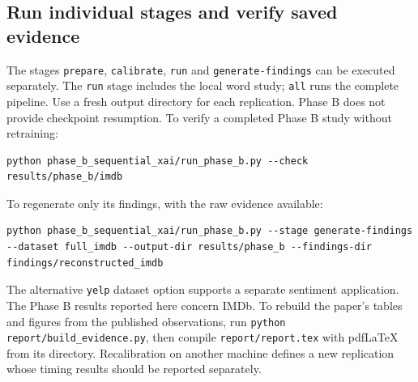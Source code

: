 \documentclass[12pt,a4paper]{article}
\begin{document}
\subsection{Run individual stages and verify saved evidence}
The stages \texttt{prepare}, \texttt{calibrate}, \texttt{run} and \texttt{generate-findings} can be executed separately. The \texttt{run} stage includes the local word study; \texttt{all} runs the complete pipeline. Use a fresh output directory for each replication. Phase B does not provide checkpoint resumption.
To verify a completed Phase B study without retraining:
\begin{lstlisting}
python phase_b_sequential_xai/run_phase_b.py --check results/phase_b/imdb
\end{lstlisting}
To regenerate only its findings, with the raw evidence available:
\begin{lstlisting}
python phase_b_sequential_xai/run_phase_b.py --stage generate-findings --dataset full_imdb --output-dir results/phase_b --findings-dir findings/reconstructed_imdb
\end{lstlisting}
The alternative \texttt{yelp} dataset option supports a separate sentiment application. The Phase B results reported here concern IMDb.
To rebuild the paper's tables and figures from the published observations, run \texttt{python report/build\_evidence.py}, then compile \texttt{report/report.tex} with pdfLaTeX from its directory. Recalibration on another machine defines a new replication whose timing results should be reported separately.
\end{document}
